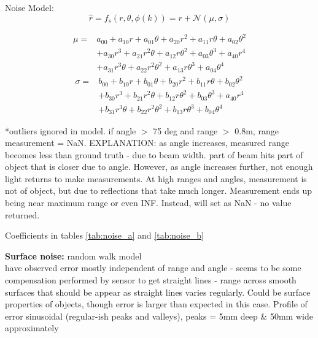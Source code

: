 		Noise Model:\\
		\begin{equation}
			\hat{r} = f_s(r,\theta,\phi(k)) = r + \mathcal{N}(\mu,\sigma)
		\end{equation}	
		
		\begin{equation}
			\begin{aligned}
				\mu = & a_{00} + a_{10}r + a_{01}\theta + a_{20}r^2 + a_{11}r\theta + a_{02}\theta^2\\
				      & + a_{30}r^3 + a_{21}r^2\theta + a_{12}r\theta^2 + a_{03}\theta^3 + a_{40}r^4 \\ 
				      & + a_{31}r^3\theta + a_{22}r^2\theta^2 + a_{13}r\theta^3 + a_{04}\theta^4
			\end{aligned}		
		\end{equation}
		\begin{equation}
			\begin{aligned}
				\sigma = & b_{00} + b_{10}r + b_{01}\theta + b_{20}r^2 + b_{11}r\theta + b_{02}\theta^2\\
			         	 & + b_{30}r^3 + b_{21}r^2\theta + b_{12}r\theta^2 + b_{03}\theta^3 + a_{40}r^4 \\ 
			         	 & + b_{31}r^3\theta + b_{22}r^2\theta^2 + b_{13}r\theta^3 + b_{04}\theta^4
			\end{aligned}
		\end{equation}
		
		*outliers ignored in model. if angle $>$ 75 deg and range $>$ 0.8m, range measurement = NaN. EXPLANATION: as angle increases, measured range becomes less than ground truth - due to beam width. part of beam hits part of object that is closer due to angle. However, as angle increases further, not enough light returns to make measurements. At high ranges and angles, measurement is not of object, but due to reflections that take much longer. Measurement ends up being near maximum range or even INF. Instead, will set as NaN - no value returned.
		
		Coefficients in tables \ref{tab:noise_a} and \ref{tab:noise_b}
		
		

		\textbf{Surface noise:}
		random walk model\\
		have observed error mostly independent of range and angle - seems to be some compensation performed by sensor to get straight lines - range across smooth surfaces that should be appear as straight lines varies regularly.
		Could be surface properties of objects, though error is larger than expected in this case.
		Profile of error sinusoidal (regular-ish peaks and valleys), peaks = 5mm deep \& 50mm wide approximately
		

